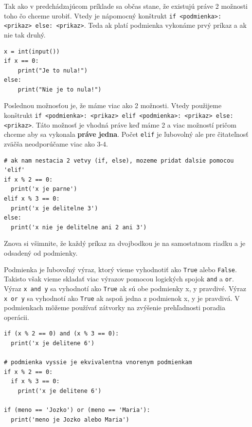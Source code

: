 \documentclass{article}
\begin{document}
Tak ako v predchádzajúcom príklade sa občas stane, že existujú práve 2 možnosti toho čo chceme urobiť. Vtedy je nápomocný konštrukt \texttt{if <podmienka>: <prikaz> else: <prikaz>}. Teda ak platí podmienka vykonáme prvý príkaz a ak nie tak druhý.

\begin{lstlisting}
x = int(input())
if x == 0:
    print("Je to nula!")
else:
    print("Nie je to nula!")
\end{lstlisting}

Poslednou možnosťou je, že máme viac ako 2 možnosti. Vtedy použijeme konštrukt \texttt{if <podmienka>: <prikaz> elif <podmienka>: <prikaz> else: <prikaz>}.
Táto možnosť je vhodná práve keď máme 2 a viac možností pričom chceme aby sa vykonala \textbf{práve jedna}. Počet \texttt{elif} je ľubovolný ale pre čitateľnosť zväčša neodporúčame viac ako $3$-$4$.

\begin{lstlisting}
# ak nam nestacia 2 vetvy (if, else), mozeme pridat dalsie pomocou 'elif'
if x % 2 == 0:
  print('x je parne')
elif x % 3 == 0:
  print('x je delitelne 3')
else:
  print('x nie je delitelne ani 2 ani 3')
\end{lstlisting}
Znova si všimnite, že každý príkaz za dvojbodkou je na samostatnom riadku a je odsadený od podmienky.


Podmienka je ľubovoľný výraz, ktorý vieme vyhodnotiť ako \texttt{True} alebo \texttt{False}.
Takisto však vieme skladať viac výrazov pomocou logických spojok \texttt{and} a \texttt{or}.
Výraz \texttt{x and y} sa vyhodnotí ako \texttt{True} ak sú obe podmienky x, y pravdivé. 
Výraz \texttt{x or y} sa vyhodnotí ako \texttt{True} ak aspoň jedna z podmienok x, y je pravdivá.
V podmienkach môžeme používať zátvorky na zvýšenie prehľadnosti poradia operácii.

\begin{lstlisting}
if (x % 2 == 0) and (x % 3 == 0):
  print('x je delitene 6')

# podmienka vyssie je ekvivalentna vnorenym podmienkam
if x % 2 == 0:
  if x % 3 == 0:
    print('x je delitene 6')

if (meno == 'Jozko') or (meno == 'Maria'):
  print('meno je Jozko alebo Maria')
\end{lstlisting}
\end{document}
